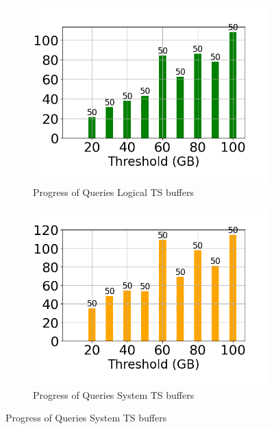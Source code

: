\begin{figure}
	\centering
	\begin{subfigure}[c]{0.4\textwidth}
		\includegraphics[width=1\textwidth]   {figures/Experiments/Dynamic/Progress/5/average_query_time_per_batch_version_999777015_10485760_10_delay[5].png}
		\caption{Progress of Queries Logical TS buffers}
		\label{fig:progress-queries-5-logical}
	\end{subfigure}
	\begin{subfigure}[c]{0.4\textwidth}
		\includegraphics[width=1\textwidth]   {figures/Experiments/Dynamic/Progress/5/average_query_time_per_batch_version_999777018_10485760_10_delay[5].png}
		\caption{Progress of Queries System TS buffers}

\end{subfigure}
\end{figure}
